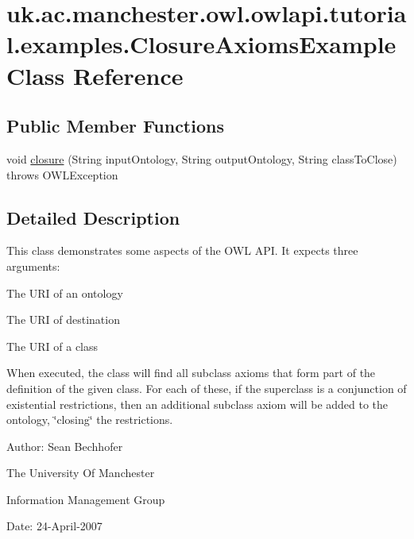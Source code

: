 \hypertarget{classuk_1_1ac_1_1manchester_1_1owl_1_1owlapi_1_1tutorial_1_1examples_1_1_closure_axioms_example}{\section{uk.\-ac.\-manchester.\-owl.\-owlapi.\-tutorial.\-examples.\-Closure\-Axioms\-Example Class Reference}
\label{classuk_1_1ac_1_1manchester_1_1owl_1_1owlapi_1_1tutorial_1_1examples_1_1_closure_axioms_example}
}
\subsection*{Public Member Functions}
\begin{DoxyCompactItemize}
\item 
void \hyperlink{classuk_1_1ac_1_1manchester_1_1owl_1_1owlapi_1_1tutorial_1_1examples_1_1_closure_axioms_example_a1a424740a08b9c1be664c7d93bc59a2a}{closure} (String input\-Ontology, String output\-Ontology, String class\-To\-Close)  throws O\-W\-L\-Exception 
\end{DoxyCompactItemize}


\subsection{Detailed Description}
This class demonstrates some aspects of the O\-W\-L A\-P\-I. It expects three arguments\-: 


\begin{DoxyEnumerate}
\item The U\-R\-I of an ontology 


\item The U\-R\-I of destination 


\item The U\-R\-I of a class 
\end{DoxyEnumerate}

When executed, the class will find all subclass axioms that form part of the definition of the given class. For each of these, if the superclass is a conjunction of existential restrictions, then an additional subclass axiom will be added to the ontology, \char`\"{}closing\char`\"{} the restrictions. 

Author\-: Sean Bechhofer\par
 The University Of Manchester\par
 Information Management Group\par
 Date\-: 24-\/\-April-\/2007\par
 \par
 

